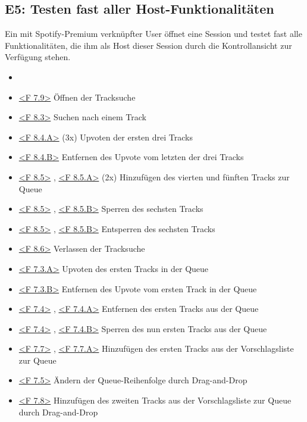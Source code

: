 \documentclass[oneside, ngerman]{sdqtechreport}
\begin{document}
\subsection{E5: Testen fast aller Host-Funktionalitäten}
\label{subsec:Tests:ErweiterteTestszenarien:E5}
Ein mit Spotify-Premium verknüpfter User öffnet eine Session und testet fast alle Funktionalitäten, die ihm als Host dieser Session durch die Kontrollansicht zur Verfügung stehen.
\begin{itemize}
    \item \gOne
    \item \hyperlink{<F 7.9>}{<F 7.9>} Öffnen der Tracksuche
    \item \hyperlink{<F 8.3>}{<F 8.3>} Suchen nach einem Track
    \item \hyperlink{<F 8.4.A>}{<F 8.4.A>} (3x) Upvoten der ersten drei Tracks
    \item \hyperlink{<F 8.4.B>}{<F 8.4.B>} Entfernen des Upvote vom letzten der drei Tracks
    \item \hyperlink{<F 8.5>}{<F 8.5>} , \hyperlink{<F 8.5.A>}{<F 8.5.A>} (2x) Hinzufügen des vierten und fünften Tracks zur Queue
    \item \hyperlink{<F 8.5>}{<F 8.5>} , \hyperlink{<F 8.5.B>}{<F 8.5.B>} Sperren des sechsten Tracks
    \item \hyperlink{<F 8.5>}{<F 8.5>} , \hyperlink{<F 8.5.B>}{<F 8.5.B>} Entsperren des sechsten Tracks
    \item \hyperlink{<F 8.6>}{<F 8.6>} Verlassen der Tracksuche
    \item \hyperlink{<F 7.3.A>}{<F 7.3.A>} Upvoten des ersten Tracks in der Queue
    \item \hyperlink{<F 7.3.B>}{<F 7.3.B>} Entfernen des Upvote vom ersten Track in der Queue
    \item \hyperlink{<F 7.4>}{<F 7.4>} , \hyperlink{<F 7.4.A>}{<F 7.4.A>} Entfernen des ersten Tracks aus der Queue
    \item \hyperlink{<F 7.4>}{<F 7.4>} , \hyperlink{<F 7.4.B>}{<F 7.4.B>} Sperren des nun ersten Tracks aus der Queue
    \item \hyperlink{<F 7.7>}{<F 7.7>} , \hyperlink{<F 7.7.A>}{<F 7.7.A>} Hinzufügen des ersten Tracks aus der Vorschlagsliste zur Queue
    \item \hyperlink{<F 7.5>}{<F 7.5>} Ändern der Queue-Reihenfolge durch Drag-and-Drop
    \item \hyperlink{<F 7.8>}{<F 7.8>} Hinzufügen des zweiten Tracks aus der Vorschlagsliste zur Queue durch Drag-and-Drop

\end{itemize}
\end{document}
